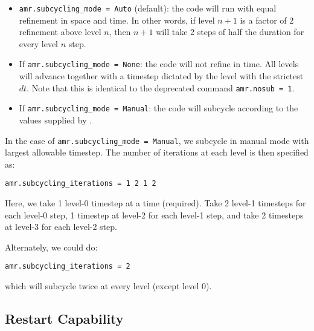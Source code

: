 \begin{itemize}
\item {\tt amr.subcycling\_mode = Auto} (default): the code will run
  with equal refinement in space and time. In other words, if level
  $n+1$ is a factor of 2 refinement above level $n$, then $n+1$ will
  take 2 steps of half the duration for every level $n$ step.

\item If {\tt amr.subcycling\_mode = None}: the code will not refine
  in time. All levels will advance together with a timestep dictated
  by the level with the strictest $dt$. Note that this is identical to
  the deprecated command {\tt amr.nosub = 1}.

\item If {\tt amr.subcycling\_mode = Manual}: the code will subcycle
  according to the values supplied by .

\end{itemize}

In the case of {\tt amr.subcycling\_mode = Manual}, we subcycle in
manual mode with largest allowable timestep.  The number of iterations
at each level is then specified as:
\begin{lstlisting}
amr.subcycling_iterations = 1 2 1 2
\end{lstlisting}
Here, we take 1 level-0 timestep at a time (required). Take 2 level-1
timesteps for each level-0 step, 1 timestep at level-2 for each
level-1 step, and take 2 timesteps at level-3 for each level-2 step.

Alternately, we could do:
\begin{lstlisting}
amr.subcycling_iterations = 2
\end{lstlisting}
which will subcycle twice at every level (except level 0).


\subsection{Restart Capability}

